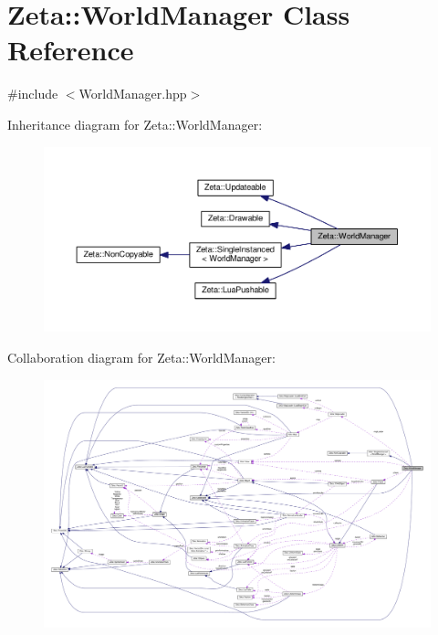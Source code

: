 \hypertarget{classZeta_1_1WorldManager}{\section{Zeta\+:\+:World\+Manager Class Reference}
\label{classZeta_1_1WorldManager}
}


{\ttfamily \#include $<$World\+Manager.\+hpp$>$}



Inheritance diagram for Zeta\+:\+:World\+Manager\+:\nopagebreak
\begin{figure}[H]
\begin{center}
\leavevmode
\includegraphics[width=350pt]{classZeta_1_1WorldManager__inherit__graph}
\end{center}
\end{figure}


Collaboration diagram for Zeta\+:\+:World\+Manager\+:
\nopagebreak
\begin{figure}[H]
\begin{center}
\leavevmode
\includegraphics[width=350pt]{classZeta_1_1WorldManager__coll__graph}
\end{center}
\end{figure}
